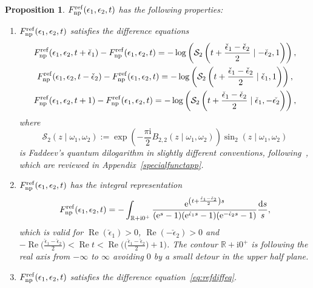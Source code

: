 \documentclass[pdftex]{sigma}
\numberwithin{equation}{section}
\newtheorem{Proposition}[Theorem]{Proposition}
 { \theoremstyle{definition}
\newtheorem{Definition}[Theorem]{Definition}
\newtheorem{Note}[Theorem]{Note}
\newtheorem{Example}[Theorem]{Example}
\newtheorem{Remark}[Theorem]{Remark} }
\begin{document}
\begin{Proposition}
$F^{{\rm ref}}_{{\rm np}}(\epsilon_1,\epsilon_2,t)$ has the following properties:
\begin{enumerate}\itemsep=0pt
 \item[$1.$] $F^{{\rm ref}}_{{\rm np}}(\epsilon_1,\epsilon_2,t)$
satisfies the difference equations
\begin{gather}
 F_{{\rm np}}^{{\rm ref}}(\epsilon_1,\epsilon_2,t+\check{\epsilon}_1)-F_{{\rm np}}^{{\rm ref}}(\epsilon_1,\epsilon_2,t)= - \log\left( \mathcal{S}_2\left(t+\frac{\check\epsilon_1-\check\epsilon_2}{2} \mid {-}\check{\epsilon}_2,1\right) \right), \nonumber \\
 F_{{\rm np}}^{{\rm ref}}(\epsilon_1,\epsilon_2,t-\check{\epsilon}_2)-F_{{\rm np}}^{{\rm ref}}(\epsilon_1,\epsilon_2,t)= - \log\left( \mathcal{S}_2\left(t+\frac{\check\epsilon_1-\check\epsilon_2}{2} \mid \check{\epsilon}_1,1 \right) \right),\nonumber\\
F_{{\rm np}}^{{\rm ref}}(\epsilon_1,\epsilon_2,t+1)-F_{{\rm np}}^{{\rm ref}}(\epsilon_1,\epsilon_2,t)= - \log\left( \mathcal{S}_2\left(t+\frac{\check\epsilon_1-\check\epsilon_2}{2} \mid \check{\epsilon}_1, -\check{\epsilon_2} \right) \right),\label{eps1shift}
\end{gather}
where
\begin{equation*}
 \mathcal{S}_2(z \mid \omega_1,\omega_2) := \exp\left(-\frac{\pi \mathrm{i}}{2} B_{2,2}(z\mid \omega_1,\omega_2)\right) \sin_2(z \mid \omega_1,\omega_2)
\end{equation*}
is Faddeev's quantum dilogarithm in slightly different conventions, following~{\rm \cite{Bridgeland1,Narukawa}}, which are reviewed in Appendix~{\rm \ref{specialfunctapp}}.

\item[$2.$] $F^{{\rm ref}}_{{\rm np}}(\epsilon_1,\epsilon_2,t)$ has the integral representation
\begin{equation}\label{eq:intreprref}
F^{{\rm ref}}_{{\rm np}}(\epsilon_1,\epsilon_2,t) = - \int_{\mathbb{R}+\mathrm{i} 0^{+}} \frac{{\rm e}^{\left(t+\frac{\check{\epsilon}_1 - \check{\epsilon}_2}{2} \right)s}}{({\rm e}^s-1)({\rm e}^{\check{\epsilon}_1s}-1) ({\rm e}^{-\check{\epsilon}_2s}-1) } \frac{{\rm d}s}{s},
\end{equation}
which is valid for $\operatorname{Re} (\check{\epsilon}_1) >0$, $\operatorname{Re}(-\check{\epsilon}_2) >0$ and $-\operatorname{Re}\big(\frac{\check{\epsilon}_1 -\check{\epsilon}_2}{2} \big) < \operatorname{Re} t < \operatorname{Re} \big(\big(\frac{\check{\epsilon}_1 -\check{\epsilon}_2}{2}\big)+1\big)$. The contour $\mathbb{R}+\mathrm{i} 0^{+}$ is following the real axis from $-\infty$ to $\infty$ avoiding $0$ by a small detour in the upper half plane.
\item[$3.$] $F^{{\rm ref}}_{{\rm np}}(\epsilon_1,\epsilon_2,t) $ satisfies the difference equation~\eqref{eq:refdiffeq}.


\end{enumerate}
\end{Proposition}
\end{document}
